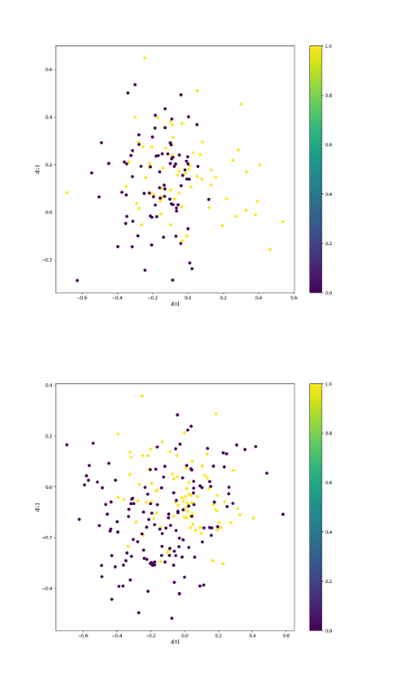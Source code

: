 \begin{figure}[H]
	\centering
	
	\begin{minipage}[b]{0.45\columnwidth}
		\centering
		\includegraphics[clip, width=\linewidth]{fig/variational_auto_encoder/vae_colon_epoch_100_c13_he}
		\label{fig:}
	\end{minipage}
	\begin{minipage}[b]{0.45\columnwidth}
		\centering
		\includegraphics[clip, width=\linewidth]{fig/variational_auto_encoder/vae_colon_epoch_299_c13_rgb}

\end{minipage}
\end{figure}
